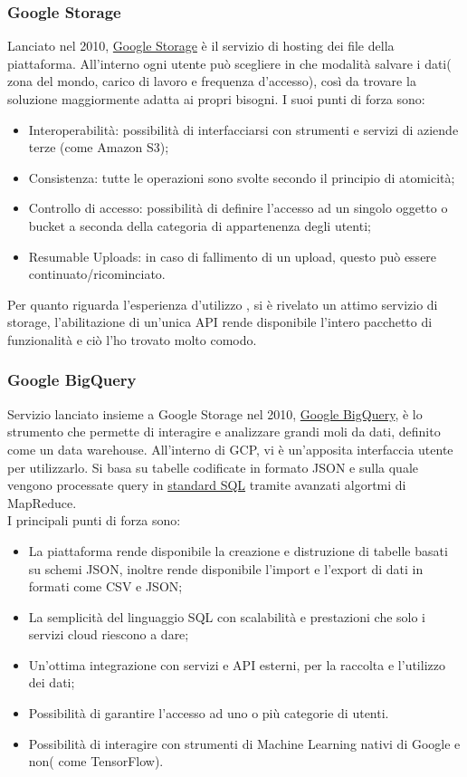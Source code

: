 \subsubsection{Google Storage}
Lanciato nel 2010, \href{https://cloud.google.com/storage/}{Google Storage} è il servizio di hosting dei file della piattaforma. All'interno ogni utente può scegliere in che modalità salvare i dati( zona del mondo, carico di lavoro e frequenza d'accesso), così da trovare la soluzione maggiormente adatta ai propri bisogni.
I suoi punti di forza sono:
\begin{itemize}
	\item Interoperabilità: possibilità di interfacciarsi con strumenti e servizi di aziende terze (come Amazon S3);
	\item Consistenza: tutte le operazioni sono svolte secondo il principio di \gls{atomicità};
	\item Controllo di accesso: possibilità di definire l'accesso ad un singolo oggetto o \gls{bucket} a seconda della categoria di appartenenza degli utenti;
	\item Resumable Uploads: in caso di fallimento di un upload, questo può essere continuato/ricominciato.
\end{itemize}

Per quanto riguarda l'esperienza d'utilizzo , si è rivelato un attimo servizio di storage, l'abilitazione di un'unica API rende disponibile l'intero pacchetto di funzionalità e ciò l'ho trovato molto comodo.
\subsubsection{Google BigQuery}
Servizio lanciato insieme a Google Storage nel 2010, \href{https://cloud.google.com/bigquery/}{Google BigQuery}, è lo strumento che permette di interagire e analizzare grandi moli da dati, definito come un \gls{data warehouse}. All'interno di GCP, vi è un'apposita interfaccia utente per utilizzarlo. Si basa su tabelle codificate in formato JSON e sulla quale vengono processate query in \href{https://cloud.google.com/bigquery/docs/reference/standard-sql/enabling-standard-sql}{standard SQL} tramite avanzati algortmi di \gls{MapReduce}.
\\I principali punti di forza sono:
\begin{itemize}
	\item La piattaforma rende disponibile la creazione e distruzione di tabelle basati su schemi JSON, inoltre rende disponibile l'import e l'export di dati in formati come CSV e JSON;
	\item La semplicità del linguaggio SQL con scalabilità e prestazioni che solo i servizi cloud riescono a dare;
	\item Un'ottima integrazione con servizi e API esterni, per la raccolta e l'utilizzo dei dati;
	\item Possibilità di garantire l'accesso ad uno o più categorie di utenti.
	\item Possibilità di interagire con strumenti di Machine Learning nativi di Google e non( come TensorFlow).
\end{itemize}

